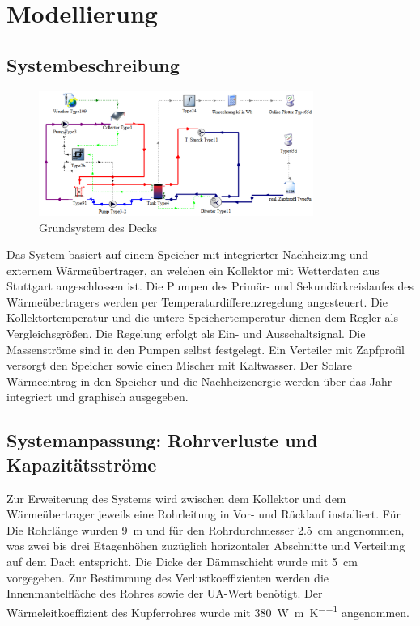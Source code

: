 \section{Modellierung}
\subsection{Systembeschreibung}
\begin{figure}[H]
	\centering
	\includegraphics[width=0.8\textwidth]{../DATA/std_deck.png}
	\caption[Grundsystem]{Grundsystem des Decks}
	\label{fig:std_deck}
\end{figure}

Das System basiert auf einem Speicher mit integrierter Nachheizung und externem Wärmeübertrager, an welchen ein Kollektor mit Wetterdaten aus Stuttgart angeschlossen ist. Die Pumpen des Primär- und Sekundärkreislaufes des Wärmeübertragers werden per Temperaturdifferenzregelung angesteuert. Die Kollektortemperatur und die untere Speichertemperatur dienen dem Regler als Vergleichsgrößen. Die Regelung erfolgt als Ein- und Ausschaltsignal. Die Massenströme sind in den Pumpen selbst festgelegt. Ein Verteiler mit Zapfprofil versorgt den Speicher sowie einen Mischer mit Kaltwasser. Der Solare Wärmeeintrag in den Speicher und die Nachheizenergie werden über das Jahr integriert und graphisch ausgegeben.

\subsection{Systemanpassung: Rohrverluste und Kapazitätsströme}
Zur Erweiterung des Systems wird  zwischen dem Kollektor und dem Wärmeübertrager jeweils eine Rohrleitung in Vor- und Rücklauf installiert. Für Die Rohrlänge wurden \SI{9}{\meter} und für den Rohrdurchmesser \SI{2,5}{\centi\meter} angenommen, was zwei bis drei Etagenhöhen zuzüglich horizontaler Abschnitte und Verteilung auf dem Dach entspricht. Die Dicke der Dämmschicht wurde mit \SI{5}{\centi\meter} vorgegeben. Zur Bestimmung des Verlustkoeffizienten werden die Innenmantelfläche des Rohres sowie der UA-Wert benötigt. Der Wärmeleitkoeffizient des Kupferrohres wurde mit \SI{380}{\watt\per\meter\per\kelvin} angenommen.


